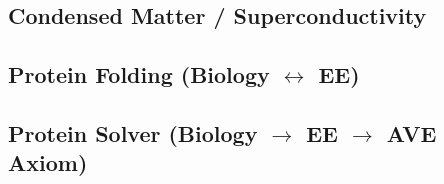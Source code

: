 \subsection{Condensed Matter / Superconductivity}


\subsection{Protein Folding (Biology $\leftrightarrow$ EE)}


\subsection{Protein Solver (Biology $\to$ EE $\to$ AVE Axiom)}


